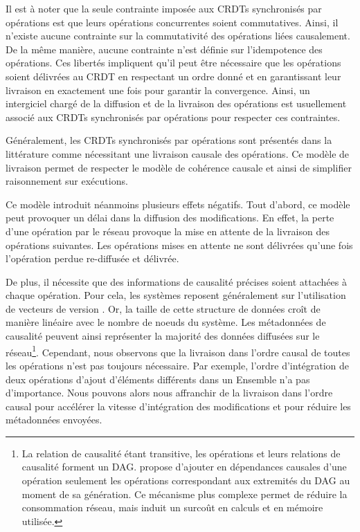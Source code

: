 Il est à noter que la seule contrainte imposée aux \acp{CRDT} synchronisés par opérations est que leurs opérations concurrentes soient commutatives.
Ainsi, il n'existe aucune contrainte sur la commutativité des opérations liées causalement.
De la même manière, aucune contrainte n'est définie sur l'idempotence des opérations.
Ces libertés impliquent qu'il peut être nécessaire que les opérations soient délivrées au \ac{CRDT} en respectant un ordre donné et en garantissant leur livraison en exactement une fois pour garantir la convergence.
Ainsi, un intergiciel chargé de la diffusion et de la livraison des opérations est usuellement associé aux \acp{CRDT} synchronisés par opérations pour respecter ces contraintes.

Généralement, les \acp{CRDT} synchronisés par opérations sont présentés dans la littérature comme nécessitant une livraison causale des opérations.
Ce modèle de livraison permet de respecter le modèle de cohérence causale et ainsi de simplifier raisonnement sur exécutions.

Ce modèle introduit néanmoins plusieurs effets négatifs.
Tout d'abord, ce modèle peut provoquer un délai dans la diffusion des modifications.
En effet, la perte d'une opération par le réseau provoque la mise en attente de la livraison des opérations suivantes.
Les opérations mises en attente ne sont délivrées qu'une fois l'opération perdue re-diffusée et délivrée.

De plus, il nécessite que des informations de causalité précises soient attachées à chaque opération.
Pour cela, les systèmes reposent généralement sur l'utilisation de vecteurs de version .
Or, la taille de cette structure de données croît de manière linéaire avec le nombre de noeuds du système.
Les métadonnées de causalité peuvent ainsi représenter la majorité des données diffusées sur le réseau\footnote{
  La relation de causalité étant transitive, les opérations et leurs relations de causalité forment un DAG.
  \cite{1997-causal-barrier} propose d'ajouter en dépendances causales d'une opération seulement les opérations correspondant aux extremités du DAG au moment de sa génération.
  Ce mécanisme plus complexe permet de réduire la consommation réseau, mais induit un surcoût en calculs et en mémoire utilisée.
}.
Cependant, nous observons que la livraison dans l'ordre causal de toutes les opérations n'est pas toujours nécessaire.
Par exemple, l'ordre d'intégration de deux opérations d'ajout d'éléments différents dans un Ensemble n'a pas d'importance.
Nous pouvons alors nous affranchir de la livraison dans l'ordre causal pour accélérer la vitesse d'intégration des modifications et pour réduire les métadonnées envoyées.

